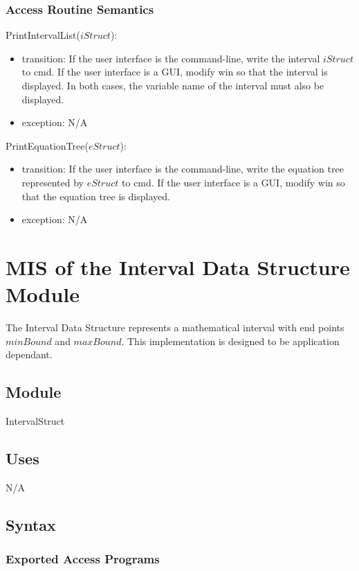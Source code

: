 \documentclass[12pt, titlepage]{article}
\begin{document}
\subsubsection{Access Routine Semantics}

\noindent PrintIntervalList($iStruct$):
\begin{itemize}
	\item transition: If the user interface is the command-line, write the 
	interval $iStruct$ to cmd. If the user interface is a GUI, modify win so 
	that the interval is displayed. In both cases, the variable name of the 
	interval must also be displayed.
	\item exception: N/A
\end{itemize}

\noindent PrintEquationTree($eStruct$):
\begin{itemize}
	\item transition: If the user interface is the command-line, write the 
	equation tree represented by $eStruct$ to cmd. If the user interface is a 
	GUI, modify win so that the equation tree is displayed.
	\item exception: N/A
\end{itemize}

\newpage

\section{MIS of the Interval Data Structure Module} 
\label{Module_intervaldatastructure}
The Interval Data Structure represents a mathematical interval with end points 
$minBound$ and $maxBound$. This implementation is designed to be application 
dependant.

\subsection{Module}

IntervalStruct

\subsection{Uses}

N/A

\subsection{Syntax}

\subsubsection{Exported Access Programs}
\end{document}
